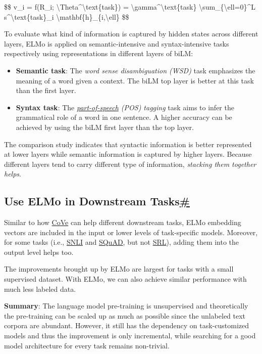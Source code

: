 \$\$ v\_i = f(R\_i; \textbackslash Theta\^{}\textbackslash text\{task\}) = \textbackslash gamma\^{}\textbackslash text\{task\} \textbackslash sum\_\{\textbackslash ell=0\}\^{}L s\^{}\textbackslash text\{task\}\_i \textbackslash mathbf\{h\}\_\{i,\textbackslash ell\} \$\$

To evaluate what kind of information is captured by hidden states across different layers, ELMo is applied on semantic-intensive and syntax-intensive tasks respectively using representations in different layers of biLM:

\begin{itemize}
\tightlist
\item
  \textbf{Semantic task}: The \emph{word sense disambiguation (WSD)} task emphasizes the meaning of a word given a context. The biLM top layer is better at this task than the first layer.
\item
  \textbf{Syntax task}: The \emph{\href{https://en.wikipedia.org/wiki/Part-of-speech_tagging}{part-of-speech} (POS) tagging} task aims to infer the grammatical role of a word in one sentence. A higher accuracy can be achieved by using the biLM first layer than the top layer.
\end{itemize}

The comparison study indicates that syntactic information is better represented at lower layers while semantic information is captured by higher layers. Because different layers tend to carry different type of information, \emph{stacking them together helps}.

\subsection{\texorpdfstring{Use ELMo in Downstream Tasks\hyperref[use-elmo-in-downstream-tasks]{\#}}{Use ELMo in Downstream Tasks\#}}\label{use-elmo-in-downstream-tasks}

Similar to how \hyperref[use-cove-in-downstream-tasks]{CoVe} can help different downstream tasks, ELMo embedding vectors are included in the input or lower levels of task-specific models. Moreover, for some tasks (i.e., \hyperref[nli]{SNLI} and \hyperref[qa]{SQuAD}, but not \hyperref[srl]{SRL}), adding them into the output level helps too.

The improvements brought up by ELMo are largest for tasks with a small supervised dataset. With ELMo, we can also achieve similar performance with much less labeled data.

\textbf{Summary}: The language model pre-training is unsupervised and theoretically the pre-training can be scaled up as much as possible since the unlabeled text corpora are abundant. However, it still has the dependency on task-customized models and thus the improvement is only incremental, while searching for a good model architecture for every task remains non-trivial.

